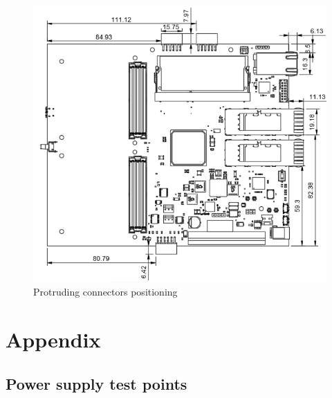 \documentclass[12pt,oneside,a4]{article}
\begin{document}
\begin{figure}[H]
\begin{center}
\includegraphics[width=1\linewidth]{connectors.png}
 \caption{Protruding connectors positioning}\label{connectors}
\end{center}
\end{figure}

\section{Appendix}
\subsection{Power supply test points}
\end{document}
